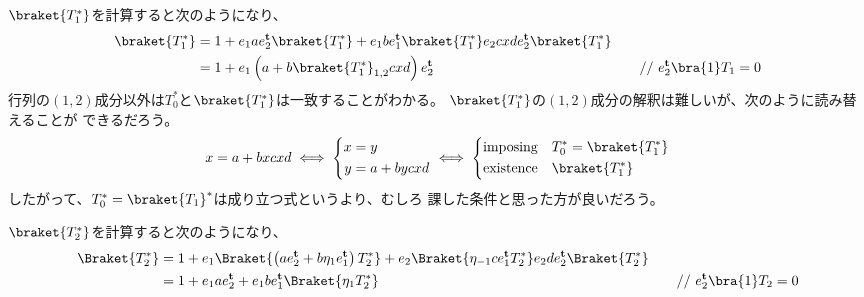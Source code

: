{	$\braket{T_1^*}$を計算すると次のようになり、
	\begin{alignat*}{2}
		\braket{T_1^*} &= 1 + e_1ae_2^\tran\braket{T_1^*}
			+ e_1be_1^\tran\braket{T_1^*}e_2cxde_2^\tran\braket{T_1^*} \\
		&= 1 + e_1\lr{a + b\braket{T_1^*}_{1,2}cxd}e_2^\tran
			&\quad\text{// } e_2^\tran\bra{1}T_1 = 0
	\end{alignat*}
	行列の$(1,2)$成分以外は$T_0^*$と$\braket{T_1^*}$は一致することがわかる。
	$\braket{T_1^*}$の$(1,2)$成分の解釈は難しいが、次のように読み替えることが
	できるだろう。
	\begin{equation*}\begin{split}
		x = a + bxcxd \iff \left\{\begin{split}
			x &= y \\
			y &= a + bycxd
		\end{split}\right. \iff \left\{\begin{split}
			\text{imposing} &\quad T_0^* = \braket{T_1^*} \\
			\text{existence} &\quad \braket{T_1^*} \\
		\end{split}\right.
	\end{split}\end{equation*}
	したがって、$T_0^*=\braket{T_1}^*$は成り立つ式というより、むしろ
	課した条件と思った方が良いだろう。

	$\braket{T_2^*}$を計算すると次のようになり、
	\begin{alignat*}{2}
		\Braket{T_2^*} &= 1
			+ e_1\Braket{\lr{ae_2^\tran + b\eta_1e_1^\tran}T_2^*}
			+ e_2\Braket{\eta_{-1}ce_1^\tran T_2^*}e_2de_2^\tran\Braket{T_2^*} \\
		&= 1 + e_1ae_2^\tran + e_1be_1^\tran\Braket{\eta_1T_2^*}
			&\quad\text{// } e_2^\tran\bra{1}T_2 = 0
	\end{alignat*}
}
